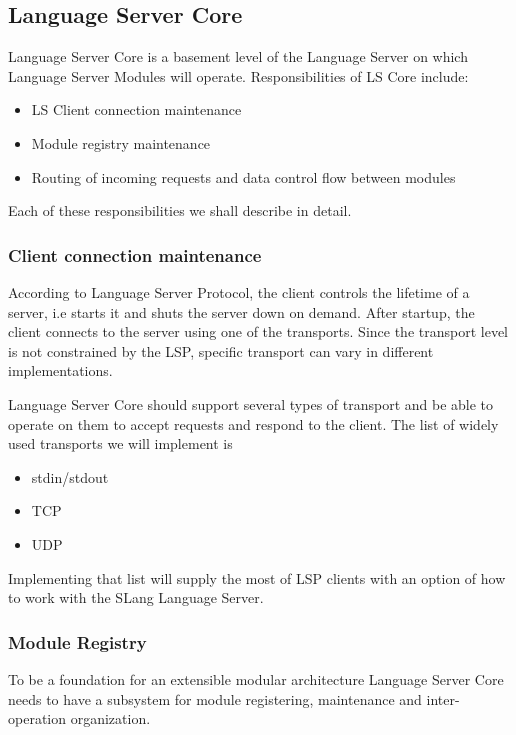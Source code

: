 \subsection{Language Server Core}
\label{sec:met:arch:core}
Language Server Core is a basement level of the Language Server on which Language Server Modules will operate.
Responsibilities of LS Core include:
\begin{itemize}
    \item LS Client connection maintenance
    \item Module registry maintenance
    \item Routing of incoming requests and data control flow between modules
\end{itemize}

Each of these responsibilities we shall describe in detail.

\subsubsection{Client connection maintenance}
\label{sec:met:arch:core:connection_maintenance}
According to Language Server Protocol\cite{Sourcegraph}, the client controls the lifetime of a server, 
i.e starts it and shuts the server down on demand. After startup, the client connects to the server
using one of the transports. Since the transport level is not constrained by the LSP, specific transport can vary in different implementations.

Language Server Core should support several types of transport and be able to operate on them to accept requests and respond to the client. The list of widely used transports we will implement is
\begin{itemize}
    \item stdin/stdout
    \item TCP
    \item UDP
\end{itemize}
Implementing that list will supply the most of LSP clients with an option of how to work with the SLang Language Server.  

\subsubsection{Module Registry}
\label{sec:met:arch:core:module_registry}

To be a foundation for an extensible modular architecture Language Server Core needs to have a subsystem 
for module registering, maintenance and inter-operation organization.

